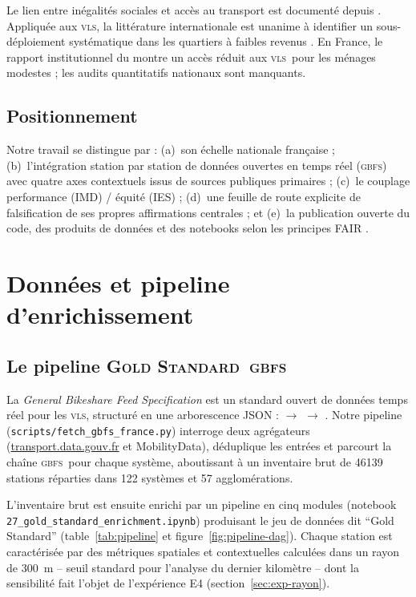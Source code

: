 \documentclass[11pt,a4paper]{article}
\newcommand{\VLS}{\textsc{vls}\xspace}
\newcommand{\GBFS}{\textsc{gbfs}\xspace}
\newcommand{\GS}{\textsc{Gold Standard}\xspace}
\begin{document}
Le lien entre inégalités sociales et accès au transport est
documenté depuis \citet{Hodge1995}. Appliquée aux \VLS, la
littérature internationale est unanime à identifier un
sous-déploiement systématique dans les quartiers à faibles
revenus \citep{Smith2015, McNeil2017, Hosford2018, Caspi2021}. En
France, le rapport institutionnel du \citet{Cerema2022} montre
un accès réduit aux \VLS\ pour les ménages modestes ; les audits
quantitatifs nationaux sont manquants.

\subsection{Positionnement}

Notre travail se distingue par : (a)~son échelle nationale
française ; (b)~l'intégration station par station de données
ouvertes en temps réel (\GBFS) avec quatre axes contextuels issus
de sources publiques primaires ; (c)~le couplage performance
(IMD) / équité (IES) ; (d)~une feuille de route explicite de
falsification de ses propres affirmations centrales ; et
(e)~la publication ouverte du code, des produits de données et
des notebooks selon les principes FAIR \citep{Wilkinson2016}.

\section{Données et pipeline d'enrichissement}
\label{sec:data}

\subsection{Le pipeline \GS\ \GBFS}

La \emph{General Bikeshare Feed Specification} \citep{Mobi2024}
est un standard ouvert de données temps réel pour les \VLS,
structuré en une arborescence JSON : 
$\rightarrow$  $\rightarrow$
. Notre pipeline
(\texttt{scripts/fetch\_gbfs\_france.py}) interroge deux
agrégateurs (\url{transport.data.gouv.fr} et MobilityData),
déduplique les entrées et parcourt la chaîne \GBFS\ pour chaque
système, aboutissant à un inventaire brut de \num{46139} stations
réparties dans \num{122} systèmes et \num{57} agglomérations.

L'inventaire brut est ensuite enrichi par un pipeline en cinq
modules (notebook
\texttt{27\_gold\_standard\_enrichment.ipynb}) produisant le jeu
de données dit \enquote{Gold Standard} (table~\ref{tab:pipeline}
et figure~\ref{fig:pipeline-dag}). Chaque station est
caractérisée par des métriques spatiales et contextuelles
calculées dans un rayon de \SI{300}{\metre} -- seuil standard
pour l'analyse du dernier kilomètre \citep{ElGeneidy2016,
Saberi2018} -- dont la sensibilité fait l'objet de l'expérience
E4 (section~\ref{sec:exp-rayon}).
\end{document}
